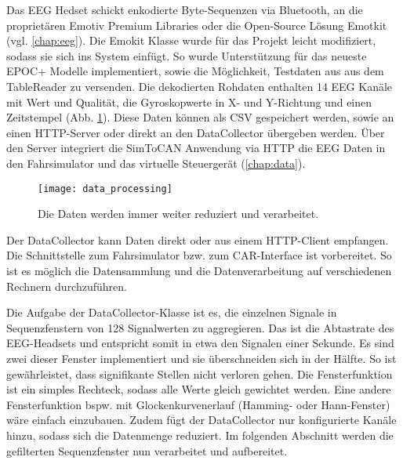 \label{sec:fetching}
 
Das EEG Hedset schickt enkodierte Byte-Sequenzen via Bluetooth, an die proprietären Emotiv Premium Libraries oder die Open-Source Lösung Emotkit (vgl. \ref{chap:eeg}). Die Emokit Klasse wurde für das Projekt leicht modifiziert, sodass sie sich ins System einfügt. So wurde Unterstützung für das neueste EPOC+ Modelle implementiert, sowie die Möglichkeit, Testdaten  aus aus dem TableReader zu versenden. 
Die dekodierten Rohdaten enthalten 14 EEG Kanäle mit Wert und Qualität, die Gyroskopwerte in X- und Y-Richtung und einen Zeitstempel (Abb. \ref{fig:data_processing}). Diese Daten können als CSV gespeichert werden, sowie an einen HTTP-Server oder direkt an den DataCollector übergeben werden. Über den Server integriert die SimToCAN Anwendung via HTTP die EEG Daten in den Fahrsimulator und das virtuelle Steuergerät (\ref{chap:data}).

\begin{figure}[h] 
  \begin{center}
    \texttt{[image: data\_processing]}
    \caption[Datenverarbeitung]{Die Daten werden immer weiter reduziert und verarbeitet. \label{fig:data_processing}}
  \end{center}
\end{figure}

Der DataCollector kann Daten direkt oder aus einem HTTP-Client empfangen. Die Schnittstelle zum Fahrsimulator bzw. zum CAR-Interface ist vorbereitet. So ist es möglich die Datensammlung und die Datenverarbeitung auf verschiedenen Rechnern durchzuführen.

Die Aufgabe der DataCollector-Klasse ist es, die einzelnen Signale in Sequenzfenstern von 128 Signalwerten zu aggregieren. Das ist die Abtastrate des EEG-Headsets und entspricht somit in etwa den Signalen einer Sekunde. Es sind zwei dieser Fenster implementiert und sie überschneiden sich in der Hälfte. So ist gewährleistet, dass signifikante Stellen nicht verloren gehen. Die Fensterfunktion ist ein simples Rechteck, sodass alle Werte gleich gewichtet werden. Eine andere Fensterfunktion bspw. mit Glockenkurvenerlauf (Hamming- oder Hann-Fenster) wäre einfach einzubauen. Zudem fügt der DataCollector nur konfigurierte Kanäle hinzu, sodass sich die Datenmenge reduziert. Im folgenden Abschnitt werden die gefilterten Sequenzfenster nun verarbeitet und aufbereitet.
